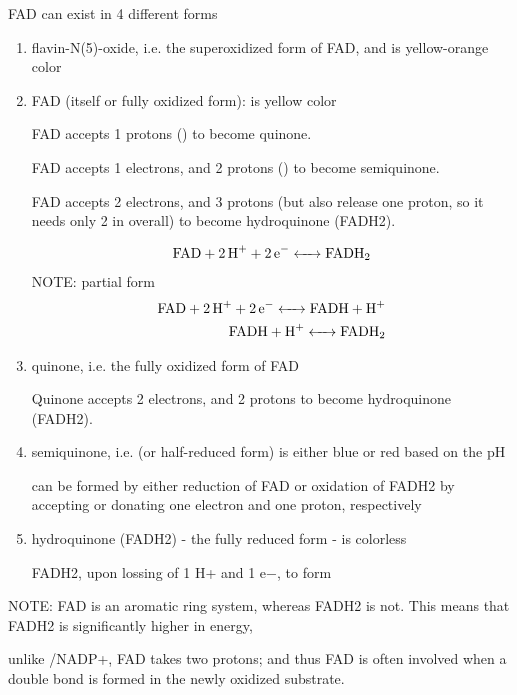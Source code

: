 FAD can exist in 4 different forms
\begin{enumerate}

  \item flavin-N(5)-oxide, i.e. the superoxidized form of FAD, and is
  yellow-orange color
  
  \item FAD  (itself or fully oxidized form): is yellow color 

FAD accepts 1 protons () to become quinone.

FAD accepts 1  electrons, and 2 protons () to become semiquinone.

FAD accepts 2 electrons, and 3 protons (but also release one proton, so it
needs only 2 in overall) to become hydroquinone (FADH2).

\begin{equation}
\ce{FAD + 2H+ + 2e- <-> FADH2}
\end{equation}
NOTE: partial form
\begin{equation}
\begin{split}
\ce{FAD + 2H+ + 2e- <-> FADH + H+} \\
\ce{FADH + H+ <-> FADH2}
\end{split}
\end{equation}

  \item quinone, i.e. the fully oxidized form of FAD

Quinone accepts 2 electrons, and 2 protons to become hydroquinone (FADH2).
  
  \item semiquinone, i.e.  (or half-reduced form) is either blue or
  red based on the pH
  
   can be formed by either reduction of FAD or oxidation of FADH2
  by accepting or donating one electron and one proton, respectively
  
  \item hydroquinone (FADH2) - the fully reduced form - is colorless

FADH2, upon lossing of 1 H+ and 1 e−, to form  

\end{enumerate}

NOTE:  FAD is an aromatic ring system, whereas FADH2 is not. This means that
FADH2 is significantly higher in energy,

unlike /NADP+, FAD takes two protons; and thus FAD is often
involved when a double bond is formed in the newly oxidized substrate.

